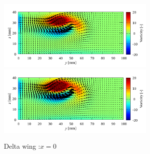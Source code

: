 \documentclass[twocolumn,a4j]{jsarticle}
\begin{document}
\begin{figure}[htbp]
{		
		\includegraphics[keepaspectratio, width=78mm]{../images/Simulation/3_kOmegaSST/x=0.png}
		\includegraphics[keepaspectratio, width=78mm]{../images/Simulation/4_Smagorinsky/x=0.png}
	}
	\caption{Delta wing :$x=0$}
\end{figure}
\end{document}
